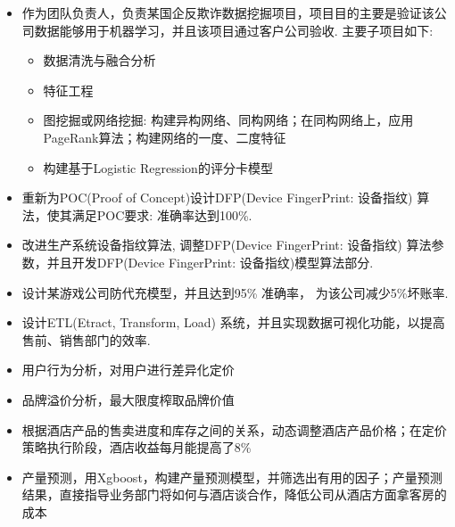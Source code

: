 \documentclass{resume}
\begin{document}
\begin{onehalfspacing}
\begin{itemize}
  \item 作为团队负责人，负责某国企反欺诈数据挖掘项目，项目目的主要是验证该公司数据能够用于机器学习，并且该项目通过客户公司验收. 主要子项目如下:
  \begin{itemize}
     \item 数据清洗与融合分析
     \item 特征工程
     \item 图挖掘或网络挖掘: 构建异构网络、同构网络；在同构网络上，应用PageRank算法；构建网络的一度、二度特征
     \item 构建基于Logistic Regression的评分卡模型
  \end{itemize}	
  \item 重新为POC(Proof of Concept)设计DFP(Device FingerPrint: 设备指纹) 算法，使其满足POC要求: 准确率达到100\%.
  \item 改进生产系统设备指纹算法, 调整DFP(Device FingerPrint: 设备指纹) 算法参数，并且开发DFP(Device FingerPrint: 设备指纹)模型算法部分.
  \item 设计某游戏公司防代充模型，并且达到95\% 准确率， 为该公司减少5\%坏账率.
  \item 设计ETL(Etract, Transform, Load) 系统，并且实现数据可视化功能，以提高售前、销售部门的效率.	  
\end{itemize}
\end{onehalfspacing}

\begin{onehalfspacing}
\begin{itemize}
  \item 用户行为分析，对用户进行差异化定价
  \item 品牌溢价分析，最大限度榨取品牌价值	  
  \item 根据酒店产品的售卖进度和库存之间的关系，动态调整酒店产品价格；在定价策略执行阶段，酒店收益每月能提高了8\%
  \item 产量预测，用Xgboost，构建产量预测模型，并筛选出有用的因子；产量预测结果，直接指导业务部门将如何与酒店谈合作，降低公司从酒店方面拿客房的成本
\end{itemize}
\end{onehalfspacing}

\end{document}
